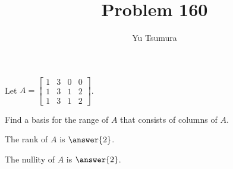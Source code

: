 \documentclass{ximera}
\title{Problem 160}
\author{Yu Tsumura}
\begin{document}
\begin{problem}

  Let $A=\begin{bmatrix}
    1 & 3 & 0 &   0 \\
    1 &3 &  1 & 2  \\
    1 & 3 & 1 & 2
  \end{bmatrix}$.
  
  Find a basis for the range of $A$ that consists of columns of $A$.

  \begin{multipleChoice}
  \end{multipleChoice}
  
  The rank of $A$ is $\answer{2}$.
  
  The nullity of $A$ is $\answer{2}$.
  
\end{problem}
          
\end{document}
